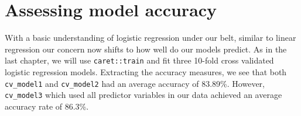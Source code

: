 \documentclass[]{book}
\theoremstyle{definition}
\theoremstyle{definition}
\theoremstyle{definition}
\theoremstyle{remark}
\begin{document}
\hypertarget{assessing-model-accuracy-1}{%
\section{Assessing model accuracy}\label{assessing-model-accuracy-1}}

With a basic understanding of logistic regression under our belt,
similar to linear regression our concern now shifts to how well do our
models predict. As in the last chapter, we will use
\texttt{caret::train} and fit three 10-fold cross validated logistic
regression models. Extracting the accuracy measures, we see that both
\texttt{cv\_model1} and \texttt{cv\_model2} had an average accuracy of
83.89\%. However, \texttt{cv\_model3} which used all predictor variables
in our data achieved an average accuracy rate of 86.3\%.
\end{document}
